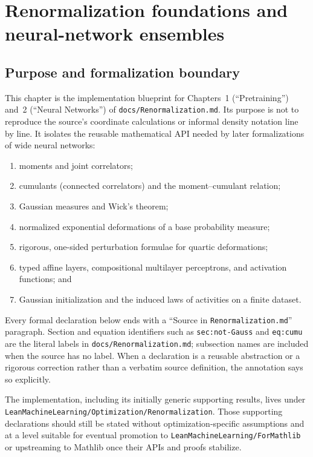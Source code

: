 \chapter{Renormalization foundations and neural-network ensembles}
\label{chap:renormalization}

\section{Purpose and formalization boundary}

This chapter is the implementation blueprint for Chapters~1 (``Pretraining'') and~2
(``Neural Networks'') of \texttt{docs/Renormalization.md}.  Its purpose is not to reproduce the
source's coordinate calculations or informal density notation line by line.  It isolates the
reusable mathematical API needed by later formalizations of wide neural networks:
\begin{enumerate}
  \item moments and joint correlators;
  \item cumulants (connected correlators) and the moment--cumulant relation;
  \item Gaussian measures and Wick's theorem;
  \item normalized exponential deformations of a base probability measure;
  \item rigorous, one-sided perturbation formulae for quartic deformations;
  \item typed affine layers, compositional multilayer perceptrons, and activation functions; and
  \item Gaussian initialization and the induced laws of activities on a finite dataset.
\end{enumerate}

Every formal declaration below ends with a ``Source in \texttt{Renormalization.md}'' paragraph.
Section and equation identifiers such as \texttt{sec:not-Gauss} and \texttt{eq:cumu} are the literal
labels in \texttt{docs/Renormalization.md}; subsection names are included when the source has no
label.  When a declaration is a reusable abstraction or a rigorous correction rather than a
verbatim source definition, the annotation says so explicitly.

The implementation, including its initially generic supporting results, lives under
\texttt{LeanMachineLearning/Optimization/Renormalization}.  Those supporting declarations should
still be stated without optimization-specific assumptions and at a level suitable for eventual
promotion to \texttt{LeanMachineLearning/ForMathlib} or upstreaming to Mathlib once their APIs and
proofs stabilize.

